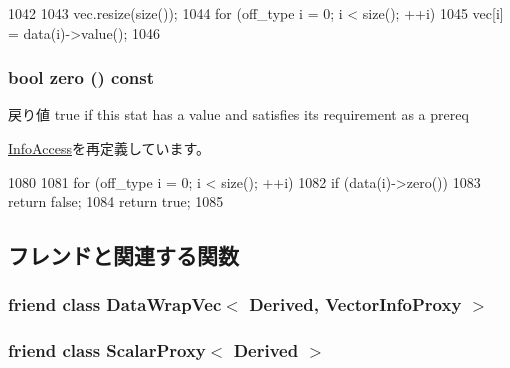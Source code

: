 \begin{DoxyCode}
1042     {
1043         vec.resize(size());
1044         for (off_type i = 0; i < size(); ++i)
1045             vec[i] = data(i)->value();
1046     }
\end{DoxyCode}
\hypertarget{classStats_1_1VectorBase_a4e72b01b727d3165e75cba84eb507491}{
\subsubsection[{zero}]{\setlength{\rightskip}{0pt plus 5cm}bool zero () const}}
\label{classStats_1_1VectorBase_a4e72b01b727d3165e75cba84eb507491}
\begin{DoxyReturn}{戻り値}
true if this stat has a value and satisfies its requirement as a prereq 
\end{DoxyReturn}


\hyperlink{classStats_1_1InfoAccess_a4e72b01b727d3165e75cba84eb507491}{InfoAccess}を再定義しています。


\begin{DoxyCode}
1080     {
1081         for (off_type i = 0; i < size(); ++i)
1082             if (data(i)->zero())
1083                 return false;
1084         return true;
1085     }
\end{DoxyCode}


\subsection{フレンドと関連する関数}
\hypertarget{classStats_1_1VectorBase_abc1eabc978bf7f6f598c8c16411b22f2}{
\subsubsection[{DataWrapVec$<$ Derived, VectorInfoProxy $>$}]{\setlength{\rightskip}{0pt plus 5cm}friend class {\bf DataWrapVec}$<$ Derived, {\bf VectorInfoProxy} $>$}}
\label{classStats_1_1VectorBase_abc1eabc978bf7f6f598c8c16411b22f2}
\hypertarget{classStats_1_1VectorBase_a339d5293ff5abbd173dd47aa666bb3c4}{
\subsubsection[{ScalarProxy$<$ Derived $>$}]{\setlength{\rightskip}{0pt plus 5cm}friend class {\bf ScalarProxy}$<$ Derived $>$}}
\label{classStats_1_1VectorBase_a339d5293ff5abbd173dd47aa666bb3c4}


